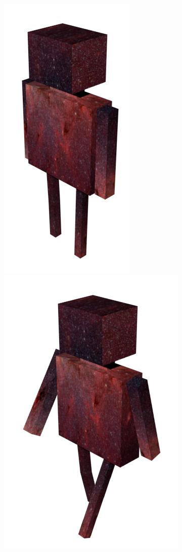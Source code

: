 \documentclass{article}
\begin{document}
 \begin{center}
\includegraphics[scale=0.5]{static}
\includegraphics[scale=0.5]{MARCHE}
\end{center}
\end{document}

